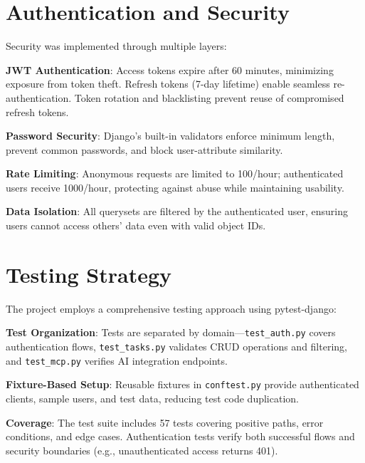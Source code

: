 \documentclass[11pt,a4paper]{article}
\begin{document}
\section{Authentication and Security}

Security was implemented through multiple layers:

\textbf{JWT Authentication}: Access tokens expire after 60 minutes, minimizing exposure from token theft. Refresh tokens (7-day lifetime) enable seamless re-authentication. Token rotation and blacklisting prevent reuse of compromised refresh tokens.

\textbf{Password Security}: Django's built-in validators enforce minimum length, prevent common passwords, and block user-attribute similarity.

\textbf{Rate Limiting}: Anonymous requests are limited to 100/hour; authenticated users receive 1000/hour, protecting against abuse while maintaining usability.

\textbf{Data Isolation}: All querysets are filtered by the authenticated user, ensuring users cannot access others' data even with valid object IDs.

\section{Testing Strategy}

The project employs a comprehensive testing approach using pytest-django:

\textbf{Test Organization}: Tests are separated by domain---\texttt{test\_auth.py} covers authentication flows, \texttt{test\_tasks.py} validates CRUD operations and filtering, and \texttt{test\_mcp.py} verifies AI integration endpoints.

\textbf{Fixture-Based Setup}: Reusable fixtures in \texttt{conftest.py} provide authenticated clients, sample users, and test data, reducing test code duplication.

\textbf{Coverage}: The test suite includes 57 tests covering positive paths, error conditions, and edge cases. Authentication tests verify both successful flows and security boundaries (e.g., unauthenticated access returns 401).
\end{document}
